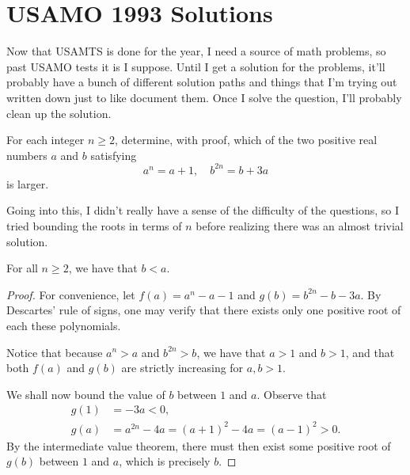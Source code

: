 \documentclass[a4paper, 10pt]{article}
\begin{document}
\section*{USAMO 1993 Solutions}

Now that USAMTS is done for the year, I need a source of math problems, so past
USAMO tests it is I suppose. Until I get a solution for the problems, it'll
probably have a bunch of different solution paths and things that I'm trying
out written down just to like document them. Once I solve the question, I'll probably clean up the solution.

\begin{chirpbox}
\begin{problemnum}
    For each integer \( n \ge 2 \), determine, with proof, which of the two positive real numbers \( a \) and \( b \) satisfying
    \[
        a^n = a + 1, \quad b^{2n} = b + 3a
    \]
    is larger.
\end{problemnum}
\end{chirpbox}

\begin{solution}
    Going into this, I didn't really have a sense of the difficulty of the
    questions, so I tried bounding the roots in terms of \( n \) before
    realizing there was an almost trivial solution.
    
    \begin{claim}
        For all \( n \ge 2 \), we have that \( b < a \).
    \end{claim}
    \begin{proof}
        For convenience, let \( f(a) = a^n - a - 1 \) and \( g(b) = b^{2n} - b
        - 3a \). By Descartes' rule of signs, one may verify that there exists
        only one positive root of each these polynomials.

        Notice that because \( a^n > a \) and \( b^{2n} > b \), we have that \(
        a > 1 \) and \( b > 1 \), and that both \( f(a) \) and \( g(b) \) are
        strictly increasing for \( a, b > 1 \).

        We shall now bound the value of \( b \) between \( 1 \) and \( a \). Observe that
        \begin{align*}
            g(1) &= -3a < 0, \\
            g(a) &= a^{2n} - 4a = (a + 1)^2 - 4a = (a-1)^2 > 0
        .\end{align*}
        By the intermediate value theorem, there must then exist some positive root of \( g(b) \) between \( 1 \) and \( a \), which is precisely \( b \).
    \end{proof}
\end{solution}
\end{document}
